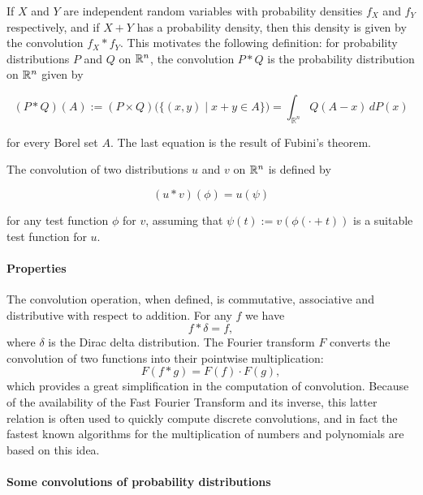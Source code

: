 \documentclass[12pt]{article}
\begin{document}
If $X$ and $Y$ are independent random variables with probability densities $f_X$ and $f_Y$ respectively, and if $X+Y$ has a probability density, then this density is given by the convolution $f_X \ast f_Y$. This motivates the following definition: for probability distributions  $P$ and $Q$ on $\Bbb{R}^n$, the convolution $P \ast Q$ is the probability distribution on $\Bbb{R}^n$ given by

\[
(P \ast Q)(A) := (P \times Q)\big( \{ (x,y) \mid x+y\in A \}\big) = \int_{\mathbb{R}^n} Q(A-x) \, dP(x) 
\]

for every Borel set $A$.  The last equation is the result of Fubini's theorem.

The convolution of two distributions $u$ and $v$ on $\Bbb{R}^n$ is defined by

\[
(u \ast v)(\phi) = u( \psi)
\]

for any test function $\phi$ for $v$, assuming that $\psi(t) := v(\phi(\cdot + t))$ is a suitable test function for $u$.

\paragraph{Properties}

The convolution operation, when defined, is commutative, associative and distributive with respect to addition. For any $f$ we have
\[f \ast \delta = f,\]
where $\delta$ is the Dirac delta distribution. The Fourier transform $F$ converts the convolution of two functions into their pointwise multiplication:
\[F(f \ast g) = F(f) \cdot F(g),\]
which provides a great simplification in the computation of convolution.  
Because of the availability of the Fast Fourier Transform and its inverse, this latter relation is often used to quickly compute discrete convolutions, and in fact the fastest known algorithms for the multiplication of numbers and polynomials are based on this idea.

\paragraph{Some convolutions of probability distributions}
\end{document}
